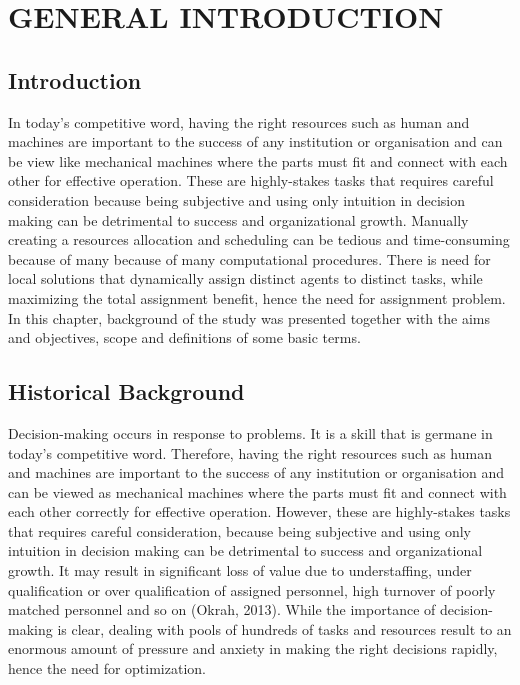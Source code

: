 \documentclass[11pt]{report}
\begin{document}
	\newpage
	\tableofcontents
	
	\newpage
	\chapter{GENERAL INTRODUCTION}
	\section{Introduction}
	In today’s competitive word, having the right resources such as human and machines are important to the success of any institution or organisation and can be view like mechanical machines where the parts must fit and connect with each other for effective operation. These are highly-stakes tasks that requires careful consideration because being subjective and using only intuition in decision making can be detrimental to success and organizational growth. Manually creating a resources allocation and scheduling can be tedious and time-consuming because of many because of many computational procedures. There is need for local solutions that dynamically assign distinct agents to distinct tasks, while maximizing the total assignment benefit, hence the need for assignment problem. In this chapter, background of the study was presented together with the aims and objectives, scope and definitions of some basic terms.
	
	\section{Historical Background}
	Decision-making occurs in response to problems. It is a skill that is germane in today's competitive word. Therefore, having the right resources such as human and machines are important to the success of any institution or organisation and can be viewed as mechanical machines where the parts must fit and connect with each other correctly for effective operation. However, these are highly-stakes tasks that requires careful consideration, because being subjective and using only intuition in decision making can be detrimental to success and organizational growth. It may result in significant loss of value due to understaffing, under qualification or over qualification of assigned personnel, high turnover of poorly matched personnel and so on (Okrah, 2013). While the importance of decision-making is clear, dealing with pools of hundreds of tasks and resources result to an enormous amount of pressure and anxiety in making the right decisions rapidly, hence the need for optimization.\\
	
\end{document}
